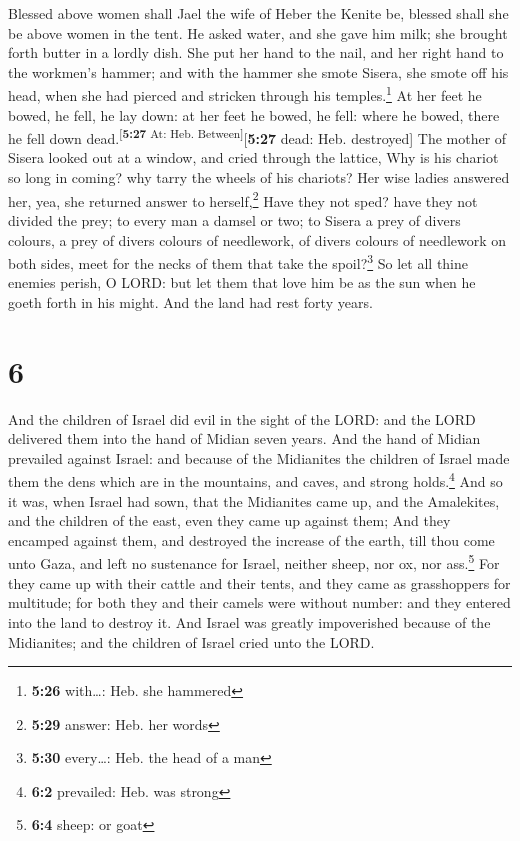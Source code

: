  Blessed above women shall Jael the wife of Heber the
Kenite be, blessed shall she be above women in the tent. 
He asked water, and she gave him milk; she brought forth butter in a
lordly dish.  She put her hand to the nail, and her right
hand to the workmen's hammer; and with the hammer she smote Sisera, she
smote off his head, when she had pierced and stricken through his
temples.\footnote{\textbf{5:26} with\ldots: Heb. she hammered}
 At her feet he bowed, he fell, he lay down: at her feet
he bowed, he fell: where he bowed, there he fell down
dead.\textsuperscript{{[}\textbf{5:27} At: Heb.
Between{]}}{[}\textbf{5:27} dead: Heb. destroyed{]}  The
mother of Sisera looked out at a window, and cried through the lattice,
Why is his chariot so long in coming? why tarry the wheels of his
chariots?  Her wise ladies answered her, yea, she
returned answer to herself,\footnote{\textbf{5:29} answer: Heb. her
  words}  Have they not sped? have they not divided the
prey; to every man a damsel or two; to Sisera a prey of divers colours,
a prey of divers colours of needlework, of divers colours of needlework
on both sides, meet for the necks of them that take the
spoil?\footnote{\textbf{5:30} every\ldots: Heb. the head of a man}
 So let all thine enemies perish, O LORD: but let them
that love him be as the sun when he goeth forth in his might. And the
land had rest forty years.

\hypertarget{section-5}{%
\section{6}\label{section-5}}

 And the children of Israel did evil in the sight of the
LORD: and the LORD delivered them into the hand of Midian seven years.
 And the hand of Midian prevailed against Israel: and
because of the Midianites the children of Israel made them the dens
which are in the mountains, and caves, and strong holds.\footnote{\textbf{6:2}
  prevailed: Heb. was strong}  And so it was, when Israel
had sown, that the Midianites came up, and the Amalekites, and the
children of the east, even they came up against them;  And
they encamped against them, and destroyed the increase of the earth,
till thou come unto Gaza, and left no sustenance for Israel, neither
sheep, nor ox, nor ass.\footnote{\textbf{6:4} sheep: or goat}
 For they came up with their cattle and their tents, and
they came as grasshoppers for multitude; for both they and their camels
were without number: and they entered into the land to destroy it.
 And Israel was greatly impoverished because of the
Midianites; and the children of Israel cried unto the LORD.

